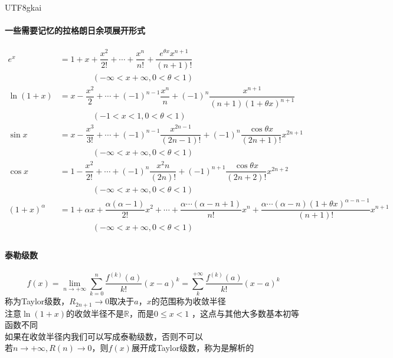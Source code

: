 \documentclass{article}
\begin{document}
\begin{CJK}{UTF8}{gkai}
\paragraph{一些需要记忆的拉格朗日余项展开形式}
\[
\begin{aligned}    
e^x &= 1 + x + \dfrac{x^2}{2!} + \cdots + \dfrac{x^n}{n!} + \dfrac{e^{\theta x} x^{n+1}}{(n+1)!}\\
&\quad\quad\quad\quad(-\infty < x + \infty , 0 < \theta < 1)\\
\ln(1 + x) &= x - \dfrac{x^2}{2} + \cdots + (-1)^{n-1} \dfrac{x^n}{n} + (-1)^n \dfrac{x^{n+1}}{(n + 1)(1 + \theta x)^{n + 1}}\\
&\quad\quad\quad\quad(-1 < x < 1 , 0 < \theta < 1)\\
\sin x &= x - \dfrac{x^3}{3!} +\cdots + (-1)^{n-1} \dfrac{x^{2n-1}}{(2n-1)!}+(-1)^{n}\dfrac{\cos\theta x}{(2n + 1)!}x^{2n+1}\\
&\quad\quad\quad\quad(-\infty < x + \infty , 0 < \theta < 1)\\
\cos x &= 1 - \dfrac{x^2}{2!} + \cdots + (-1)^n \dfrac{x^2n}{(2n)!} + (-1)^{n+1} \dfrac{\cos \theta x}{(2n + 2)!} x^{2n + 2}\\
&\quad\quad\quad\quad(-\infty < x + \infty , 0 < \theta < 1)\\
(1 + x)^\alpha &= 1 + \alpha x + \dfrac{\alpha(\alpha - 1)}{2!} x^2 + \cdots + \dfrac{\alpha \cdots (\alpha - n + 1)}{n !} x^n +\dfrac{\alpha \cdots (\alpha - n)(1 + \theta x)^{\alpha - n -1}}{(n + 1)!} x^{n + 1}\\
&\quad\quad\quad\quad(-\infty < x + \infty , 0 < \theta < 1)\\
\end{aligned}
\]

\paragraph{泰勒级数}

\[
f(x) = \lim_{n\to +\infty} \sum_{k = 0} ^n \dfrac{f^{(k)}(a)}{k!}(x-a)^k
= \sum_{k}^{+\infty} \dfrac{f^{(k)}(a)}{k!}(x-a)^k
\]
称为Taylor级数，$R_{2n+1}\to 0$取决于$a$，$x$的范围称为收敛半径\\

注意$\ln(1+x)$的收敛半径不是$\mathbb{R}$，而是$0 \leq x <1$ ，这点与其他大多数基本初等函数不同\\
如果在收敛半径内我们可以写成泰勒级数，否则不可以\\

若$n\to +\infty,R(n) \to 0$，则$f(x)$展开成Taylor级数，称为是解析的\\


\end{CJK}
\end{document}
